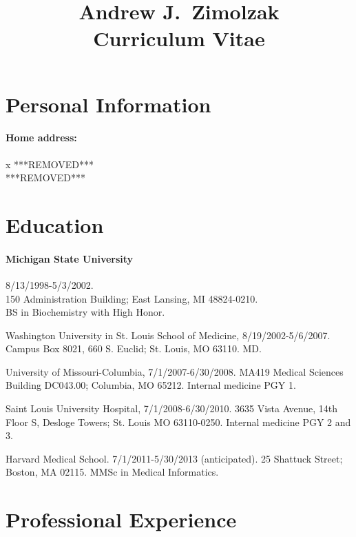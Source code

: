 \documentclass[11pt]{article}
\title{Andrew J.\ Zimolzak\\Curriculum Vitae}
\begin{document}
\maketitle

\section{Personal Information}

\paragraph{Home address:}x \newline
***REMOVED***\\
***REMOVED***

\section{Education}

\paragraph{Michigan State University} 8/13/1998-5/3/2002.\\
150 Administration Building; East Lansing, MI 48824-0210.\\
BS in Biochemistry with High Honor.

Washington University in St. Louis School of Medicine,
8/19/2002-5/6/2007.
Campus Box 8021, 660 S. Euclid; St. Louis, MO 63110.
MD.

University of Missouri-Columbia, 7/1/2007-6/30/2008.
MA419 Medical Sciences Building DC043.00; Columbia, MO 65212.
Internal medicine PGY 1.

Saint Louis University Hospital, 7/1/2008-6/30/2010.
3635 Vista Avenue, 14th Floor S, Desloge Towers; St. Louis MO
63110-0250.
Internal medicine PGY 2 and 3.

Harvard Medical School. 7/1/2011-5/30/2013 (anticipated).
25 Shattuck Street; Boston, MA 02115.
MMSc in Medical Informatics.

\section{Professional Experience}
\end{document}
